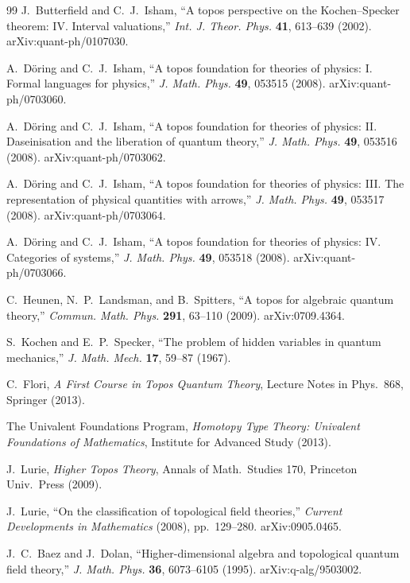 \documentclass[12pt,a4paper]{ltjsarticle}
\theoremstyle{definition}
\begin{document}
\begin{thebibliography}{99}
J.~Butterfield and C.~J.~Isham, ``A topos perspective on the Kochen--Specker theorem: IV. Interval valuations,'' \textit{Int. J. Theor. Phys.} \textbf{41}, 613--639 (2002). arXiv:quant-ph/0107030.

A.~D\"{o}ring and C.~J.~Isham, ``A topos foundation for theories of physics: I. Formal languages for physics,'' \textit{J. Math. Phys.} \textbf{49}, 053515 (2008). arXiv:quant-ph/0703060.

A.~D\"{o}ring and C.~J.~Isham, ``A topos foundation for theories of physics: II. Daseinisation and the liberation of quantum theory,'' \textit{J. Math. Phys.} \textbf{49}, 053516 (2008). arXiv:quant-ph/0703062.

A.~D\"{o}ring and C.~J.~Isham, ``A topos foundation for theories of physics: III. The representation of physical quantities with arrows,'' \textit{J. Math. Phys.} \textbf{49}, 053517 (2008). arXiv:quant-ph/0703064.

A.~D\"{o}ring and C.~J.~Isham, ``A topos foundation for theories of physics: IV. Categories of systems,'' \textit{J. Math. Phys.} \textbf{49}, 053518 (2008). arXiv:quant-ph/0703066.

C.~Heunen, N.~P.~Landsman, and B.~Spitters, ``A topos for algebraic quantum theory,'' \textit{Commun. Math. Phys.} \textbf{291}, 63--110 (2009). arXiv:0709.4364.

S.~Kochen and E.~P.~Specker, ``The problem of hidden variables in quantum mechanics,'' \textit{J. Math. Mech.} \textbf{17}, 59--87 (1967).

C.~Flori, \textit{A First Course in Topos Quantum Theory}, Lecture Notes in Phys.~868, Springer (2013).

The Univalent Foundations Program, \textit{Homotopy Type Theory: Univalent Foundations of Mathematics}, Institute for Advanced Study (2013).

J.~Lurie, \textit{Higher Topos Theory}, Annals of Math.~Studies 170, Princeton Univ.~Press (2009).

J.~Lurie, ``On the classification of topological field theories,'' \textit{Current Developments in Mathematics} (2008), pp.~129--280. arXiv:0905.0465.

J.~C.~Baez and J.~Dolan, ``Higher-dimensional algebra and topological quantum field theory,'' \textit{J. Math. Phys.} \textbf{36}, 6073--6105 (1995). arXiv:q-alg/9503002.


\end{thebibliography}
\end{document}
